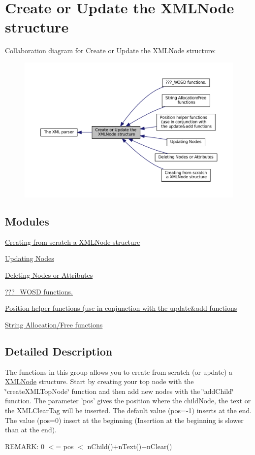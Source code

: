 \hypertarget{group__xmlModify}{\section{Create or Update the X\-M\-L\-Node structure}
\label{group__xmlModify}
}
Collaboration diagram for Create or Update the X\-M\-L\-Node structure\-:
\nopagebreak
\begin{figure}[H]
\begin{center}
\leavevmode
\includegraphics[width=350pt]{group__xmlModify}
\end{center}
\end{figure}
\subsection*{Modules}
\begin{DoxyCompactItemize}
\item 
\hyperlink{group__creation}{Creating from scratch a X\-M\-L\-Node structure}
\item 
\hyperlink{group__xmlUpdate}{Updating Nodes}
\item 
\hyperlink{group__xmlDelete}{Deleting Nodes or Attributes}
\item 
\hyperlink{group__xmlWOSD}{???\-\_\-\-W\-O\-S\-D functions.}
\item 
\hyperlink{group__xmlPosition}{Position helper functions (use in conjunction with the update\&add functions}
\item 
\hyperlink{group__StringAlloc}{String Allocation/\-Free functions}
\end{DoxyCompactItemize}


\subsection{Detailed Description}
The functions in this group allows you to create from scratch (or update) a \hyperlink{structXMLNode}{X\-M\-L\-Node} structure. Start by creating your top node with the \char`\"{}create\-X\-M\-L\-Top\-Node\char`\"{} function and then add new nodes with the \char`\"{}add\-Child\char`\"{} function. The parameter 'pos' gives the position where the child\-Node, the text or the X\-M\-L\-Clear\-Tag will be inserted. The default value (pos=-\/1) inserts at the end. The value (pos=0) insert at the beginning (Insertion at the beginning is slower than at the end). \par


R\-E\-M\-A\-R\-K\-: 0 $<$= pos $<$ n\-Child()+n\-Text()+n\-Clear() \par
 